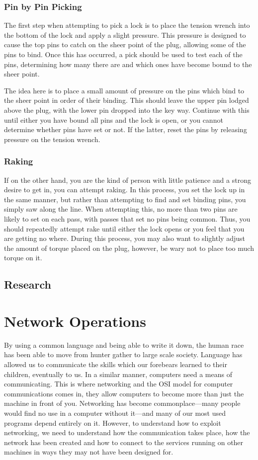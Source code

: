 \documentclass[a4paper,11pt]{report}
\begin{document}
		\subsection{Pin by Pin Picking}
			The first step when attempting to pick a lock is to place the tension wrench into the bottom of the lock and apply a slight pressure. 
			This pressure is designed to cause the top pins to catch on the sheer point of the plug, allowing some of the pins to bind. 
			Once this has occurred, a pick should be used to test each of the pins, determining how many there are and which ones have become bound to the sheer point. 

			The idea here is to place a small amount of pressure on the pins which bind to the sheer point in order of their binding. 
			This should leave the upper pin lodged above the plug, with the lower pin dropped into the key way. 
			Continue with this until either you have bound all pins and the lock is open, or you cannot determine whether pins have set or not. 
			If the latter, reset the pins by releasing pressure on the tension wrench. 
		\subsection{Raking}
			If on the other hand, you are the kind of person with little patience and a strong desire to get in, you can attempt raking. 
			In this process, you set the lock up in the same manner, but rather than attempting to find and set binding pins, you simply saw along the line. 
			When attempting this, no more than two pins are likely to set on each pass, with passes that set no pins being common. 
			Thus, you should repeatedly attempt rake until either the lock opens or you feel that you are getting no where. 
			During this process, you may also want to slightly adjust the amount of torque placed on the plug, however, be wary not to place too much torque on it. 

	\section{Research}
\chapter{Network Operations}
	\label{ch:NetworkOperations}
	By using a common language and being able to write it down, the human race has been able to move from hunter gather to large scale society. 
	Language has allowed us to communicate the skills which our forebears learned to their children, eventually to us. 
	In a similar manner, computers need a means of communicating. 
	This is where networking and the OSI model for computer communications comes in, they allow computers to become more than just the machine in front of you. 
	Networking has become commonplace---many people would find no use in a computer without it---and many of our most used programs depend entirely on it. 
	However, to understand how to exploit networking, we need to understand how the communication takes place, how the network has been created and how to connect to the services running on other machines in ways they may not have been designed for. 
\end{document}

